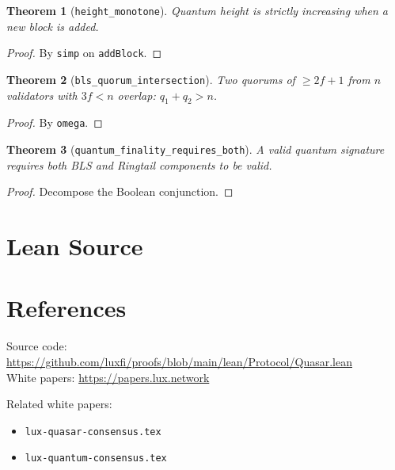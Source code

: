 \documentclass[11pt]{article}
\newtheorem{theorem}{Theorem}
\begin{document}
\begin{theorem}[\texttt{height\_monotone}]
Quantum height is strictly increasing when a new block is added.
\end{theorem}
\begin{proof}
By \texttt{simp} on \texttt{addBlock}.
\end{proof}

\begin{theorem}[\texttt{bls\_quorum\_intersection}]
Two quorums of $\geq 2f+1$ from $n$ validators with $3f < n$ overlap: $q_1 + q_2 > n$.
\end{theorem}
\begin{proof}
By \texttt{omega}.
\end{proof}

\begin{theorem}[\texttt{quantum\_finality\_requires\_both}]
A valid quantum signature requires both BLS and Ringtail components to be valid.
\end{theorem}
\begin{proof}
Decompose the Boolean conjunction.
\end{proof}


\section{Lean Source}


\section{References}
\noindent Source code: \url{https://github.com/luxfi/proofs/blob/main/lean/Protocol/Quasar.lean}\\
\noindent White papers: \url{https://papers.lux.network}

\noindent Related white papers:
\begin{itemize}
  \item \texttt{lux-quasar-consensus.tex}
  \item \texttt{lux-quantum-consensus.tex}
\end{itemize}
\end{document}
